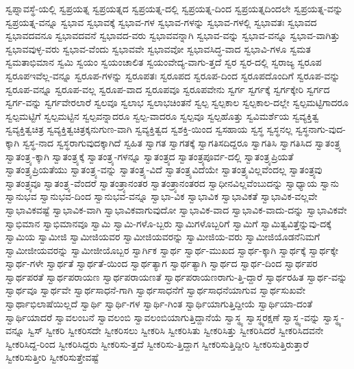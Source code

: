 {ಸ್ವಪ್ನಾವಸ್ಥೆ-ಯಲ್ಲಿ
ಸ್ವಪ್ರಯತ್ನ
ಸ್ವಪ್ರಯತ್ನದ
ಸ್ವಪ್ರಯತ್ನ-ದಲ್ಲಿ
ಸ್ವಪ್ರಯತ್ನ-ದಿಂದ
ಸ್ವಪ್ರಯತ್ನದಿಂದಲೇ
ಸ್ವಪ್ರಯತ್ನ-ವನ್ನು
ಸ್ವಪ್ರಯತ್ನ-ವನ್ನೂ
ಸ್ವಭಾವ
ಸ್ವಭಾವಕ್ಕೆ
ಸ್ವಭಾವ-ಗಳ
ಸ್ವಭಾವ-ಗಳನ್ನು
ಸ್ವಭಾವ-ಗಳಲ್ಲಿ
ಸ್ವಭಾವತಃ
ಸ್ವಭಾವದ
ಸ್ವಭಾವದವನೂ
ಸ್ವಭಾವದವನೆ
ಸ್ವಭಾವದ-ವರು
ಸ್ವಭಾವವನ್ನಾಗಿ
ಸ್ವಭಾವ-ವನ್ನು
ಸ್ವಭಾವ-ವನ್ನೂ
ಸ್ವಭಾವ-ವಾಗಿತ್ತು
ಸ್ವಭಾವವುಳ್ಳ-ವರು
ಸ್ವಭಾವ-ವೆಂದು
ಸ್ವಭಾವವೇ
ಸ್ವಭಾವವೋ
ಸ್ವಭಾವಸಿದ್ಧ-ವಾದ
ಸ್ವಭಾವಿ-ಗಳೂ
ಸ್ವಮತ
ಸ್ವಮತಾಭಿಮಾನ
ಸ್ವಮಿ
ಸ್ವಯಂ
ಸ್ವಯಂಚಾಲಿತ
ಸ್ವಯಂವೇದ್ಯ-ವಾಗು-ತ್ತದೆ
ಸ್ವರ
ಸ್ವರ-ದಲ್ಲಿ
ಸ್ವರಾಜ್ಯ
ಸ್ವರೂಪ
ಸ್ವರೂಪಇವೆಲ್ಲ-ವನ್ನೂ
ಸ್ವರೂಪ-ಗಳನ್ನು
ಸ್ವರೂಪತಃ
ಸ್ವರೂಪದ
ಸ್ವರೂಪ-ದಿಂದ
ಸ್ವರೂಪದೊಂದಿಗೆ
ಸ್ವರೂಪ-ವನ್ನು
ಸ್ವರೂಪ-ವನ್ನೂ
ಸ್ವರೂಪ-ವಲ್ಲ
ಸ್ವರೂಪ-ವಾದ
ಸ್ವರೂಪವೂ
ಸ್ವರೂಪವೇನು
ಸ್ವರ್ಗ
ಸ್ವರ್ಗಕ್ಕೆ
ಸ್ವರ್ಗಕ್ಕೇರಿ
ಸ್ವರ್ಗದ
ಸ್ವರ್ಗ-ವನ್ನು
ಸ್ವರ್ಗವೇರಲಾರೆ
ಸ್ವಲವೂ
ಸ್ವಲಾಭ
ಸ್ವಲಾಭಚಿಂತನೆ
ಸ್ವಲ್ಪ
ಸ್ವಲ್ಪಕಾಲ
ಸ್ವಲ್ಪಕಾಲ-ದಲ್ಲೇ
ಸ್ವಲ್ಪಮಟ್ಟಿಗಾದರೂ
ಸ್ವಲ್ಪಮಟ್ಟಿಗೆ
ಸ್ವಲ್ಪಮಟ್ಟಿನ
ಸ್ವಲ್ಪವನ್ನಾದರೂ
ಸ್ವಲ್ಪ-ವಾದರೂ
ಸ್ವಲ್ಪವೂ
ಸ್ವಲ್ಪಹೊತ್ತು
ಸ್ವವಿಮರ್ಶೆಯ
ಸ್ವವ್ಯಕ್ತಿತ್ವ
ಸ್ವವ್ಯಕ್ತಿತ್ವಚಿತ್ರ
ಸ್ವವ್ಯಕ್ತಿತ್ವಚಿತ್ರಕ್ಕನುಗುಣ-ವಾಗಿ
ಸ್ವವ್ಯಕ್ತಿತ್ವದ
ಸ್ವಶಕ್ತಿ-ಯಿಂದ
ಸ್ವಸಹಾಯ
ಸ್ವಸ್ಥ
ಸ್ವಸ್ಥನಲ್ಲ
ಸ್ವಸ್ಥನಾಗು-ವುದ-ಕ್ಕಾಗಿ
ಸ್ವಸ್ಥ-ನಾದ
ಸ್ವಸ್ಥರಾಗುವುದಕ್ಕಾಗಿದೆ
ಸ್ವಹಿತ
ಸ್ವಾಗತ
ಸ್ವಾಗತಕ್ಕೆ
ಸ್ವಾಗತಿಸದಿದ್ದರೂ
ಸ್ವಾಗತಿಸಿ
ಸ್ವಾಗತಿಸಿದ
ಸ್ವಾತಂತ್ರ್ಯ
ಸ್ವಾತಂತ್ರ್ಯ-ಕ್ಕಾಗಿ
ಸ್ವಾತಂತ್ರ್ಯಕ್ಕೆ
ಸ್ವಾತಂತ್ರ್ಯ-ಗಳನ್ನೂ
ಸ್ವಾತಂತ್ರ್ಯದ
ಸ್ವಾತಂತ್ರ್ಯಪೂರ್ವ-ದಲ್ಲಿ
ಸ್ವಾತಂತ್ರ್ಯಪ್ರಿಯತೆ
ಸ್ವಾತಂತ್ರ್ಯಪ್ರಿಯತೆಯು
ಸ್ವಾತಂತ್ರ್ಯ-ವನ್ನು
ಸ್ವಾತಂತ್ರ್ಯ-ವಿದೆ
ಸ್ವಾತಂತ್ರ್ಯವಿದೆಯೇ
ಸ್ವಾತಂತ್ರ್ಯವಿಲ್ಲವೆಂದಲ್ಲ
ಸ್ವಾತಂತ್ರ್ಯವು
ಸ್ವಾತಂತ್ರ್ಯವೂ
ಸ್ವಾತಂತ್ರ್ಯ-ವೆಂದರೆ
ಸ್ವಾತಂತ್ರ್ಯಾನಂತರ
ಸ್ವಾತಂತ್ರ್ಯಾನಂತರದ
ಸ್ವಾಧೀನವಿಲ್ಲವೆಂಬುದನ್ನು
ಸ್ವಾಧ್ಯಾಯ
ಸ್ವಾನು
ಸ್ವಾನುಭವ
ಸ್ವಾನುಭವ-ದಿಂದ
ಸ್ವಾನುಭವ-ವನ್ನೂ
ಸ್ವಾಭಾ-ವಿಕ
ಸ್ವಾಭಾವಿಕ
ಸ್ವಾಭಾವಿಕತೆ
ಸ್ವಾಭಾವಿಕ-ವಲ್ಲವೇ
ಸ್ವಾಭಾವಿಕವಷ್ಟೆ
ಸ್ವಾಭಾವಿಕ-ವಾಗಿ
ಸ್ವಾಭಾವಿಕವಾಗುವುದೋ
ಸ್ವಾಭಾವಿಕ-ವಾದ
ಸ್ವಾಭಾವಿಕ-ವಾದು-ದನ್ನು
ಸ್ವಾಭಾವಿಕವೇ
ಸ್ವಾಭಿಮಾನ
ಸ್ವಾಭಿಮಾನವೂ
ಸ್ವಾಮಿ
ಸ್ವಾಮಿ-ಗಳೊ-ಬ್ಬರು
ಸ್ವಾಮಿಗಳೊಬ್ಬರಿಗೆ
ಸ್ವಾಮಿಗೆ
ಸ್ವಾಮಿತ್ವವಿತ್ತೆನ್ನುವು-ದಕ್ಕೆ
ಸ್ವಾಮಿಯ
ಸ್ವಾಮೀಜಿ
ಸ್ವಾಮೀಜಿಯವರ
ಸ್ವಾಮೀಜಿಯವರನ್ನು
ಸ್ವಾಮೀಜಿಯ-ವರು
ಸ್ವಾಮೀಜಿಯೊಡನೆನಿಮಗೆ
ಸ್ವಾಮೀಜೀಯವರನ್ನು
ಸ್ವಾಮೀಜೀಯೊಬ್ಬರ
ಸ್ವಾರ್ಗಿಕ
ಸ್ವಾರ್ಥ
ಸ್ವಾರ್ಥ-ಮುಖದ
ಸ್ವಾರ್ಥ-ಕ್ಕಾಗಿ
ಸ್ವಾರ್ಥಕ್ಕೆ
ಸ್ವಾರ್ಥಕ್ಕೇ
ಸ್ವಾರ್ಥ-ಗಳೇ
ಸ್ವಾರ್ಥತೆ
ಸ್ವಾರ್ಥತೆ-ಯಿಂದ
ಸ್ವಾರ್ಥತ್ಯಾಗ
ಸ್ವಾರ್ಥತ್ಯಾಗಿ
ಸ್ವಾರ್ಥದ
ಸ್ವಾರ್ಥ-ದಿಂದ
ಸ್ವಾರ್ಥಪರ
ಸ್ವಾರ್ಥಪರತೆ
ಸ್ವಾರ್ಥಪರಾಯಣ
ಸ್ವಾರ್ಥಪರಾಯಣತೆ
ಸ್ವಾರ್ಥಪರಾಯಣರಾಗು-ತ್ತಿ-ದ್ದಾರೆ
ಸ್ವಾರ್ಥರಹಿತ
ಸ್ವಾರ್ಥ-ವನ್ನು
ಸ್ವಾರ್ಥವೂ
ಸ್ವಾರ್ಥವೇ
ಸ್ವಾರ್ಥಸಾಧನೆ-ಗಾಗಿ
ಸ್ವಾರ್ಥಸಾಧನೆಗೆ
ಸ್ವಾರ್ಥಸಾಧನೆಯಾಗುವ
ಸ್ವಾರ್ಥಸುಖವೇ
ಸ್ವಾರ್ಥಾಭಿಲಾಷೆಯಿಲ್ಲದೆ
ಸ್ವಾರ್ಥಿ
ಸ್ವಾರ್ಥಿ-ಗಳ
ಸ್ವಾರ್ಥಿ-ಗಿಂತ
ಸ್ವಾರ್ಥಿಯಾಗುತ್ತಿದ್ದೀಯೆ
ಸ್ವಾರ್ಥಿಯಾ-ದಂತೆ
ಸ್ವಾರ್ಥಿಯಾದರೆ
ಸ್ವಾವಲಂಬನೆ
ಸ್ವಾವಲಂಬಿ
ಸ್ವಾವಲಂಬಿಯಾಗುತ್ತಿದ್ದಾನೆಯೆ
ಸ್ವಾಸ್ಥ್ಯ
ಸ್ವಾಸ್ಥ್ಯರಕ್ಷಣೆ
ಸ್ವಾಸ್ಥ್ಯ-ವನ್ನು
ಸ್ವಾಸ್ಥ್ಯ-ವನ್ನೂ
ಸ್ವಿಸ್
ಸ್ವೀಕರಿ
ಸ್ವೀಕರಿಸದೇ
ಸ್ವೀಕರಿಸಲು
ಸ್ವೀಕರಿಸಿ
ಸ್ವೀಕರಿಸಿತು
ಸ್ವೀಕರಿಸಿತ್ತು
ಸ್ವೀಕರಿಸಿದರೆ
ಸ್ವೀಕರಿಸಿದವನೇ
ಸ್ವೀಕರಿಸಿದ್ದ-ರಿಂದ
ಸ್ವೀಕರಿಸಿದ್ದರು
ಸ್ವೀಕರಿಸು-ತ್ತದೆ
ಸ್ವೀಕರಿಸು-ತ್ತಿದ್ದಾಗ
ಸ್ವೀಕರಿಸುತ್ತಿದ್ದೀರಿ
ಸ್ವೀಕರಿಸುತ್ತಿರುತ್ತಾರೆ
ಸ್ವೀಕರಿಸುತ್ತೀರಿ
ಸ್ವೀಕರಿಸುತ್ತೇವಷ್ಟೆ
}
